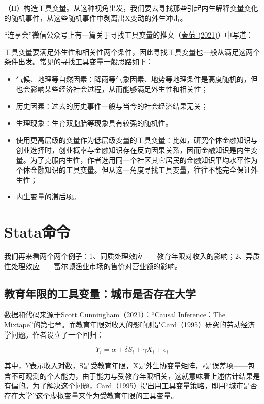 \documentclass[cn,12pt,math=newtx,citestyle=gb7714-2015,bibstyle=gb7714-2015]{elegantbook}
\begin{document}
	（II）构造工具变量。从这种视角出发，我们要去寻找那些引起内生解释变量变化的随机事件，从这些随机事件中剥离出X变动的外生冲击。
	
	“连享会”微信公众号上有一篇关于寻找工具变量的推文（\href{https://www.lianxh.cn/news/946348365bb2d.html}{秦范 (2021)}）中写道：
	
	工具变量要满足外生性和相关性两个条件，因此寻找工具变量也一般从满足这两个条件出发。常见的寻找工具变量一般思路如下：
	
	\begin{itemize}
		\item 气候、地理等自然因素：降雨等气象因素、地势等地理条件是高度随机的，但也会影响某些经济社会过程，从而能够满足外生性和相关性；
			\item 历史因素：过去的历史事件一般与当今的社会经济结果无关；
			\item 生理现象：生育双胞胎等现象具有较强的随机性。
		\item 	使用更高层级的变量作为低层级变量的工具变量：比如，研究个体金融知识与创业选择时，创业概率与金融知识存在反向因果关系，因而金融知识是内生变量。为了克服内生性，作者选用同一个社区其它居民的金融知识平均水平作为个体金融知识的工具变量。但从这一角度寻找工具变量，往往不能完全保证外生性；
			\item 内生变量的滞后项。
	\end{itemize}
	
	
	\section{Stata命令}
	
	我们再来看两个两个例子：1、同质处理效应——教育年限对收入的影响；2、异质性处理效应——富尔顿渔业市场的售价对营业额的影响。
	
	\subsection{教育年限的工具变量：城市是否存在大学}
	
	数据和代码来源于Scott Cunningham（2021）：“Causal Inference：The Mixtape”的第七章。而教育年限对收入的影响则是Card（1995）研究的劳动经济学问题。作者设立了一个回归：
	
	\begin{equation}
		Y_i = \alpha +\delta S_i + \gamma X_i +\epsilon_i
	\end{equation}
	
	其中，$Y$表示收入对数，S是受教育年限，X是外生协变量矩阵，$\epsilon$是误差项——包含不可观测的个人能力，由于能力与受教育年限相关，这就意味着上述估计结果是有偏的。为了解决这个问题，Card（1995）提出用工具变量策略，即用“城市是否存在大学”这个虚拟变量来作为受教育年限的工具变量。
	
\end{document}
